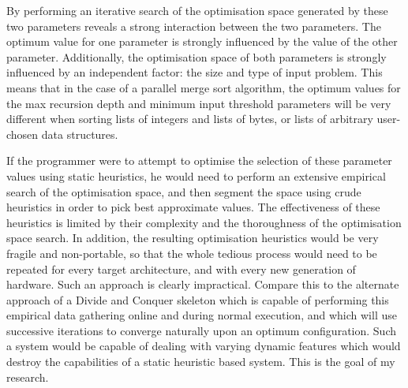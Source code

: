 By performing an iterative search of the optimisation space generated
by these two parameters reveals a strong interaction between the two
parameters. The optimum value for one parameter is strongly influenced
by the value of the other parameter. Additionally, the optimisation
space of both parameters is strongly influenced by an independent
factor: the size and type of input problem. This means that in the
case of a parallel merge sort algorithm, the optimum values for the
max recursion depth and minimum input threshold parameters will be
very different when sorting lists of integers and lists of bytes, or
lists of arbitrary user-chosen data structures.

If the programmer were to attempt to optimise the selection of these
parameter values using static heuristics, he would need to perform an
extensive empirical search of the optimisation space, and then segment
the space using crude heuristics in order to pick best approximate
values. The effectiveness of these heuristics is limited by their
complexity and the thoroughness of the optimisation space search. In
addition, the resulting optimisation heuristics would be very fragile
and non-portable, so that the whole tedious process would need to be
repeated for every target architecture, and with every new generation
of hardware. Such an approach is clearly impractical. Compare this to
the alternate approach of a Divide and Conquer skeleton which is
capable of performing this empirical data gathering online and during
normal execution, and which will use successive iterations to converge
naturally upon an optimum configuration. Such a system would be
capable of dealing with varying dynamic features which would destroy
the capabilities of a static heuristic based system. This is the goal
of my research.


